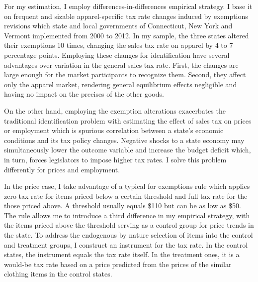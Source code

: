 \documentclass[12pt]{article}
\begin{document}
		For my estimation, I employ differences-in-differences empirical strategy. I base it on frequent and sizable apparel-specific tax rate changes induced by  exemptions revisions which state and local governments of Connecticut, New York and Vermont implemented from 2000 to 2012. In my sample, the three states altered their exemptions 10 times, changing the sales tax rate on apparel by 4 to 7 percentage points. Employing these changes for identification have several advantages over variation in the general sales tax rate. First, the changes are large enough for the market participants to recognize them. Second, they affect only the apparel market, rendering general equilibrium effects negligible and having no impact on the precises of the other goods.
		
		
		
		On the other hand, employing the exemption alterations exacerbates the traditional identification problem with estimating the effect of sales tax on prices or employment which is spurious correlation between a state's economic conditions and its tax policy changes. Negative shocks to a state economy may simultaneously lower the outcome variable and increase the budget deficit which, in turn, forces legislators to impose higher tax rates. I solve this problem differently for prices and employment. 
		
		In the price case, I take advantage of a typical for exemptions rule which applies zero tax rate for items priced below a certain threshold and full tax rate for the those priced above. A threshold usually equals \$110 but can be as low as \$50. The rule allows me to introduce a third difference in my empirical strategy, with the items priced above the threshold serving as a control group for price trends in the state. To address the endogenous by nature selection of items into the control and treatment groups, I construct an instrument for the tax rate. In the control states, the instrument equals the tax rate itself. In the treatment ones, it is a would-be tax rate based on a price predicted from the prices of the similar clothing items in the control states. 
		
\end{document}
